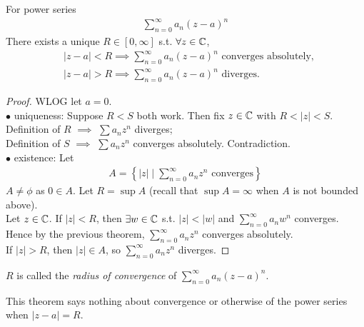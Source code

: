 \documentclass[a4paper]{article}
\begin{document}
\begin{thm}
For power series
\begin{equation*}
\begin{aligned}
\sum_{n=0}^\infty a_n\left(z-a\right)^n
\end{aligned}
\end{equation*}
There exists a unique $R\in\left[0,\infty\right]$ s.t. $\forall z\in \mathbb{C}$, 
\begin{equation*}
\begin{aligned}
&|z-a| < R \implies \sum_{n=0}^\infty a_n \left(z-a\right)^n \text{    converges absolutely},\\
&|z-a| > R \implies \sum_{n=0}^\infty a_n \left(z-a\right)^n \text{    diverges.}
\end{aligned}
\end{equation*}
\begin{proof}
WLOG let $a=0$.\\
$\bullet$ uniqueness: Suppose $R<S$ both work. Then fix $z\in\mathbb{C}$ with $R<|z|<S$.\\
Definition of $R$ $\implies$ $\sum a_n z^n$ diverges;\\
Definition of $S$ $\implies$ $\sum a_n z^n$ converges absolutely. Contradiction.\\
$\bullet$ existence: Let
\begin{equation*}
\begin{aligned}
A=\left\{|z| \mid \sum_{n=0}^\infty a_n z^n \text{   converges}\right\}
\end{aligned}
\end{equation*}
$A\neq \phi$ as $0\in A$. Let $R=\sup A$ (recall that $\sup A=\infty$ when $A$ is not bounded above).\\
Let $z\in\mathbb{C}$. If $|z|<R$, then $\exists w\in\mathbb{C}$ s.t. $|z|<|w|$ and $\sum_{n=0}^\infty a_n w^n$ converges. Hence by the previous theorem, $\sum_{n=0}^\infty a_n z^n$ converges absolutely.\\
If $|z|>R$, then $|z| \in A$, so $\sum_{n=0}^\infty a_n z^n$ diverges.
\end{proof}
\end{thm}

\begin{defi}
$R$ is called the \emph{radius of convergence} of $\sum_{n=0}^\infty a_n \left(z-a\right)^n$.
\end{defi}

\begin{rem}
This theorem says nothing about convergence or otherwise of the power series when $|z-a|=R$.\\
\end{rem}
\end{document}
